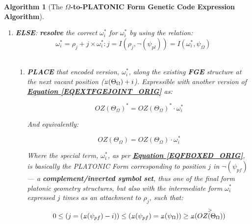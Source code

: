 \documentclass[a4paper, 18pt]{book} %
\newtheorem{alg}{Algorithm}
\newcommand{\invpi}{\rotatebox[origin=c]{180}{$\pi$}}
\begin{document}
\begin{appendices}
\begin{alg}[The \textbf{$\Omega$-to-PLATONIC Form Genetic Code Expression Algorithm}]
\begin{enumerate}
{\begin{enumerate}
{\begin{enumerate}
{\begin{enumerate}
{		}
		\item \textbf{PROCEED} to the next symbol in \textbf{IFA MSS}, $\overset{>}{OZ(\Theta_\Omega)}$\\ (loop from \textbf{Step\#2(c))}.
		\end{enumerate}
	}
	\item { \textbf{ELSE}: \textbf{resolve} the correct  $\boxed{\omega_i^*}$  for  $\omega_i^*$  by using the relation:\\

\begin{equation}
\label{EQFBOXED_ORIG}
 \boxed{\omega_i^*} = \rho_j +  j \times \omega_i^* : j = I(\rho_j,\lnot(\psi_{pl})) = I(\omega_i^*,\psi_\Omega)
\end{equation}\\

	\begin{enumerate}
        \item{\textbf{PLACE} that encoded version, $\boxed{\omega_i^*}$, along the existing \textbf{FGE} structure at the next vacant position ($\invpi(\Theta_\Omega)+i$). Expressible with another version of \textbf{\hyperref[EQEXTFGEJOINT_ORIG]{Equation \ref{EQEXTFGEJOINT_ORIG}}} as:
	
	\begin{equation}
	\label{EQEXTFGEPF_ORIG}
		\boxed{OZ(\Theta_\Omega)}^* = \boxed{OZ(\Theta_\Omega)}^* \cdot \boxed{\omega_i^*}
		\end{equation}	
		
		And equivalently:
		
		\begin{equation}
		\label{EQEXTFGEPFSUF_ORIG}
		\boxed{OZ(\Theta_\Omega)} = \boxed{OZ(\Theta_\Omega)} \cdot \boxed{\omega_i^*}
		\end{equation}	
		
            Where the special term, $\boxed{\omega_i^*}$, as per \textbf{\hyperref[EQFBOXED_ORIG]{Equation \ref{EQFBOXED_ORIG}}}, is basically the PLATONIC Form corresponding to position $j$ in $\lnot(\psi_{pf})$ --- a \textbf{complement/inverted symbol set}, thus one of the final form platonic geometry structures, but also with the intermediate form $\omega_i^*$ expressed $j$ times as an attachment to $\rho_j$, such that:\\
	
	\begin{equation}
	0 \leq (j = (\invpi(\psi_{pf})-i)) \leq (\invpi(\psi_{pf}) = \invpi(\psi_\Omega)) \geq \invpi(\overset{>}{OZ(\Theta_\Omega)})
	\end{equation}\\
	
}
\end{enumerate}}
\end{enumerate}}
\end{enumerate}}
\end{enumerate}
\end{alg}
\end{appendices}
\end{document}
